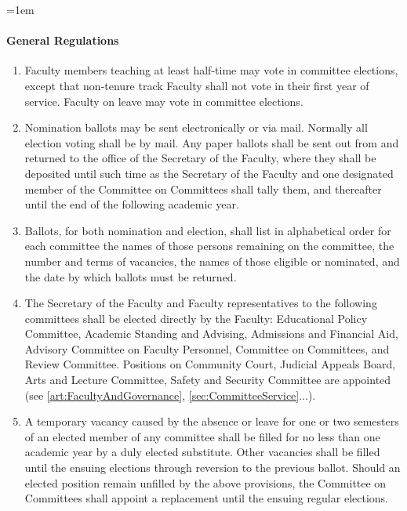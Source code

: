\documentclass{manual}
\let\oldparagraph\paragraph
\renewcommand\paragraph{\leftskip=1em\oldparagraph}
\newcommand{\itemLevelA}{\alph*.}
\newcommand{\itemRefA}{\alph*}
\begin{document}
\paragraph{General Regulations}\label{par:GeneralRegulations}
\begin{enumerate}[label=\itemLevelA,ref=\itemRefA]


\item Faculty members teaching at least half-time may vote in committee elections, except that non-tenure track Faculty shall not vote in their first year of service. Faculty on leave may vote in committee elections.

\item Nomination ballots may be sent electronically or via mail. Normally all election voting shall be by mail. Any paper ballots shall be sent out from and returned to the office of the Secretary of the Faculty, where they shall be deposited until such time as the Secretary of the Faculty and one designated member of the Committee on Committees shall tally them, and thereafter until the end of the following academic year.

\item \label{item:ballots05} Ballots, for both nomination and election, shall list in alphabetical order for each committee the names of those persons remaining on the committee, the number and terms of vacancies, the names of those eligible or nominated, and the date by which ballots must be returned.

\item The Secretary of the Faculty and Faculty representatives to the following committees shall be elected directly by the Faculty: Educational Policy Committee, Academic Standing and Advising, Admissions and Financial Aid, Advisory Committee on Faculty Personnel, Committee on Committees, and Review Committee. Positions on Community Court, Judicial Appeals Board, Arts and Lecture Committee, Safety and Security Committee are appointed (see \cref{art:FacultyAndGovernance}, \cref{sec:CommitteeService}...).

\item A temporary vacancy caused by the absence or leave for one or two semesters of an elected member of any committee shall be filled for no less than one academic year by a duly elected substitute. Other vacancies shall be filled until the ensuing elections through reversion to the previous ballot. Should an elected position remain unfilled by the above provisions, the Committee on Committees shall appoint a replacement until the ensuing regular elections.

\end{enumerate}
\end{document}
